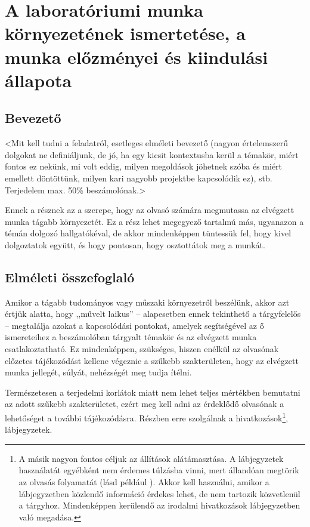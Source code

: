 \documentclass[a4paper,oneside]{article}
\begin{document}
\section{A laboratóriumi munka környezetének ismertetése,
  a munka előzményei és kiindulási állapota}
\label{sec:kornyezet}
\subsection{Bevezető}
\label{sec:bevezeto}

<Mit kell tudni a feladatról, esetleges elméleti bevezető (nagyon
értelemszerű dolgokat ne definiáljunk, de jó, ha egy kicsit
kontextusba kerül a témakör, miért fontos ez nekünk, mi volt eddig,
milyen megoldások jöhetnek szóba és miért emellett döntöttünk, milyen
kari nagyobb projektbe kapcsolódik ez), stb. Terjedelem max. 50\%
beszámolónak.>

Ennek a résznek az a szerepe, hogy az olvasó számára megmutassa az
elvégzett munka tágabb környezetét. Ez a rész lehet megegyező tartalmú
más, ugyanazon a témán dolgozó hallgatókéval, de akkor mindenképpen
tüntessük fel, hogy kivel dolgoztatok együtt, és hogy pontosan, hogy
osztottátok meg a munkát.

\subsection{Elméleti összefoglaló}

Amikor a tágabb tudományos vagy műszaki környezetről beszélünk, akkor
azt értjük alatta, hogy ,,művelt laikus'' -- alapesetben ennek
tekinthető a tárgyfelelős -- megtalálja azokat a kapcsolódási
pontokat, amelyek segítségével az ő ismereteihez a beszámolóban
tárgyalt témakör és az elvégzett munka csatlakoztatható.  Ez
mindenképpen, szükséges, hiszen enélkül az olvasónak előzetes
tájékozódást kellene végeznie a szűkebb szakterületen, hogy az
elvégzett munka jellegét, súlyát, nehézségét meg tudja ítélni.

Természetesen a terjedelmi korlátok miatt nem lehet teljes mértékben
bemutatni az adott szűkebb szakterületet, ezért meg kell adni az
érdeklődő olvasónak a lehetőséget a további tájékozódásra.  Részben
erre szolgálnak a hivatkozások\footnote{A másik nagyon fontos céljuk
  az állítások alátámasztása.  A lábjegyzetek használatát egyébként
  nem érdemes túlzásba vinni, mert állandóan megtörik az olvasás
  folyamatát (lásd például \cite{esterhazy}).  Akkor kell használni,
  amikor a lábjegyzetben közlendő információ érdekes lehet, de nem
  tartozik közvetlenül a tárgyhoz.  Mindenképpen kerülendő az irodalmi
  hivatkozások lábjegyzetben való megadása.}, lábjegyzetek.
\end{document}
